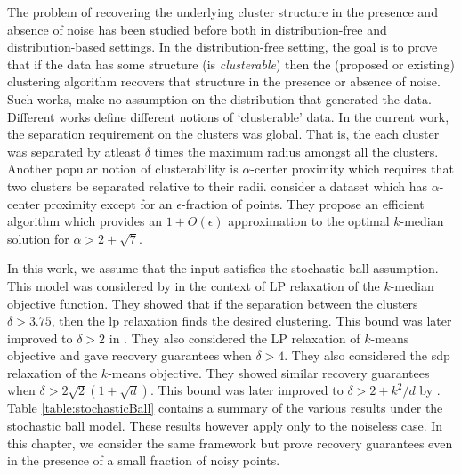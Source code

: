 \documentclass[12pt]{article}
\begin{document}
The problem of recovering the underlying cluster structure in the presence and absence of noise has been studied before both in distribution-free and distribution-based settings. In the distribution-free setting, the goal is to prove that if the data has some structure (is {\em clusterable}) then the (proposed or existing) clustering algorithm recovers that structure in the presence or absence of noise. Such works, make no assumption on the distribution that generated the data. Different works define different notions of `clusterable' data. In the current work, the separation requirement on the clusters was global. That is, the each cluster was separated by atleast $\delta$ times the maximum radius amongst all the clusters. Another popular notion of clusterability is $\alpha$-center proximity \cite{awasthi2012center} which requires that two clusters be separated relative to their radii. \cite{balcan2012clustering} consider a dataset which has $\alpha$-center proximity except for an $\epsilon$-fraction of points. They propose an efficient algorithm which provides an $1+O(\epsilon)$ approximation to the optimal $k$-median solution for $\alpha > 2 + \sqrt{7}$.

In this work, we assume that the input satisfies the stochastic ball assumption. This model was considered by \cite{nellore2015recovery} in the context of LP relaxation of the $k$-median objective function. They showed that if the separation between the clusters $\delta > 3.75$, then the lp relaxation finds the desired clustering. This bound was later improved to $\delta > 2$ in \cite{awasthi2015relax}. They also considered the LP relaxation of $k$-means objective and gave recovery guarantees when $\delta > 4$. They also considered the sdp relaxation of the $k$-means objective. They showed similar recovery guarantees when $\delta > 2\sqrt 2 (1 + \sqrt d)$. This bound was later improved to $\delta > 2 + k^2/d$ by \cite{iguchi2017probably}. Table \ref{table:stochasticBall} contains a summary of the various results under the stochastic ball model. These results however apply only to the noiseless case. In this chapter, we consider the same framework but prove recovery guarantees even in the presence of a small fraction of noisy points. 
\end{document}
